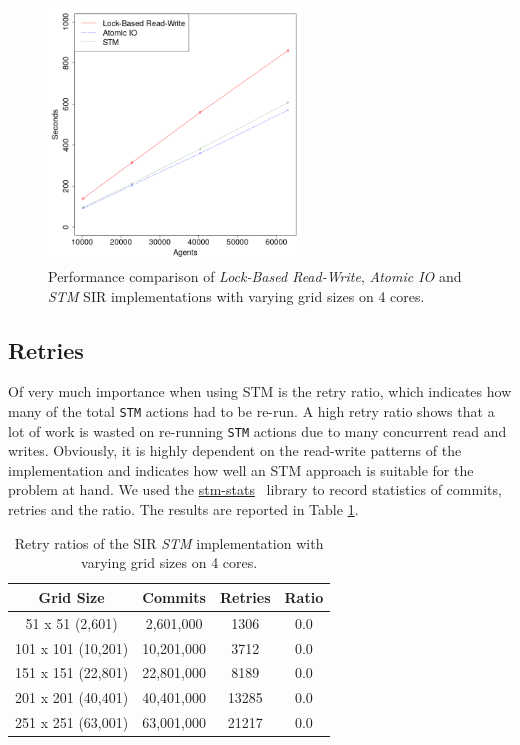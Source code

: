 \begin{figure}
	\centering
	\includegraphics[width=0.6\textwidth, angle=0]{./fig/concurrentabs/sir/sir_varyinggrid_constcores.png}
	\caption{Performance comparison of \textit{Lock-Based Read-Write}, \textit{Atomic IO} and \textit{STM} SIR implementations with varying grid sizes on 4 cores.}
	\label{fig:sir_varyinggrid_constcores}
\end{figure}

\subsection{Retries}
Of very much importance when using STM is the retry ratio, which indicates how many of the total \texttt{STM} actions had to be re-run. A high retry ratio shows that a lot of work is wasted on re-running \texttt{STM} actions due to many concurrent read and writes. Obviously, it is highly dependent on the read-write patterns of the implementation and indicates how well an STM approach is suitable for the problem at hand. We used the \href{http://hackage.haskell.org/package/stm-stats}{stm-stats}~\cite{stm_stats_library} library to record statistics of commits, retries and the ratio. The results are reported in Table \ref{tab:retries_stm}.

\begin{table}
	\centering
  	\begin{tabular}{ c || c | c | c }
        Grid Size 		   & Commits     & Retries  & Ratio  \\ \hline \hline 
   		51 x 51 (2,601)     & 2,601,000   & 1306     & 0.0    \\ \hline
   		101 x 101 (10,201)  & 10,201,000  & 3712     & 0.0    \\ \hline
   		151 x 151 (22,801)  & 22,801,000  & 8189     & 0.0    \\ \hline
   		201 x 201 (40,401)  & 40,401,000  & 13285    & 0.0    \\ \hline
   		251 x 251 (63,001)  & 63,001,000  & 21217    & 0.0    \\ \hline \hline
  	\end{tabular}
  	
  	\caption{Retry ratios of the SIR \textit{STM} implementation with varying grid sizes on 4 cores.}
	\label{tab:retries_stm}
\end{table}

